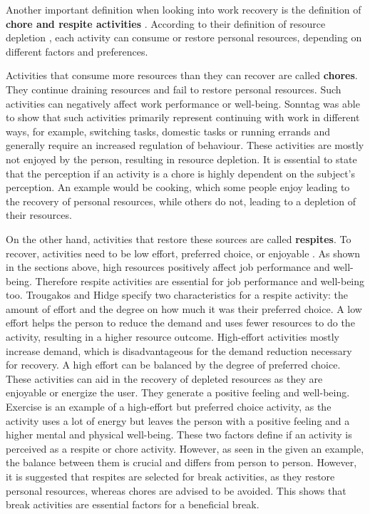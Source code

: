 \documentclass{hasel_thesis}
\begin{document}
Another important definition when looking into work recovery is the definition of \textbf{chore and respite activities} \cite{Trougakos.2009}. According to their definition of resource depletion \cite{BaumeisterR.F.BratslavskyE.MuravenM.&TiceD.M..1998}, each activity can consume or restore personal resources, depending on different factors and preferences. 

Activities that consume more resources than they can recover are called \textbf{chores}. They continue draining resources and fail to restore personal resources. Such activities can negatively affect work performance or well-being. Sonntag \cite{Sonnentag.2001} was able to show that such activities primarily represent continuing with work in different ways, for example, switching tasks, domestic tasks or running errands and generally require an increased regulation of behaviour. These activities are mostly not enjoyed by the person, resulting in resource depletion. It is essential to state that the perception if an activity is a chore is highly dependent on the subject's perception. An example would be cooking, which some people enjoy leading to the recovery of personal resources, while others do not, leading to a depletion of their resources.


On the other hand, activities that restore these sources are called \textbf{respites}. To recover, activities need to be low effort, preferred choice, or enjoyable \cite{Trougakos.2009}. As shown in the sections above, high resources positively affect job performance and well-being. Therefore respite activities are essential for job performance and well-being too. Trougakos and Hidge \cite{Trougakos.2009} specify two characteristics for a respite activity: the amount of effort and the degree on how much it was their preferred choice. A low effort helps the person to reduce the demand and uses fewer resources to do the activity, resulting in a higher resource outcome. High-effort activities mostly increase demand, which is disadvantageous for the demand reduction necessary for recovery. A high effort can be balanced by the degree of preferred choice. These activities can aid in the recovery of depleted resources as they are enjoyable or energize the user. They generate a positive feeling and well-being. Exercise is an example of a high-effort but preferred choice activity, as the activity uses a lot of energy but leaves the person with a positive feeling and a higher mental and physical well-being. These two factors define if an activity is perceived as a respite or chore activity. However, as seen in the given an example, the balance between them is crucial and differs from person to person. However, it is suggested that respites are selected for break activities, as they restore personal resources, whereas chores are advised to be avoided. This shows that break activities are essential factors for a beneficial break.
\end{document}
